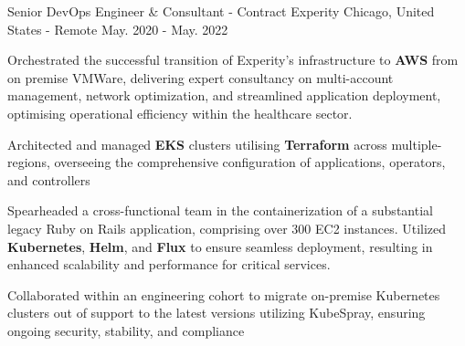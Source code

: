 \begin{cventries}
  \cventry
    {Senior DevOps Engineer \& Consultant - Contract} %
    {Experity} %
    {Chicago, United States - Remote} %
    {May. 2020 - May. 2022} %
    {
      \begin{cvitems} %
        \item {Orchestrated the successful transition of Experity's infrastructure to \textbf{AWS} from on premise VMWare, delivering expert consultancy on multi-account management, network optimization, and streamlined application deployment, optimising operational efficiency within the healthcare sector.}
        \item {Architected and managed \textbf{EKS} clusters utilising \textbf{Terraform} across multiple-regions, overseeing the comprehensive configuration of applications, operators, and controllers}
        \item {Spearheaded a cross-functional team in the containerization of a substantial legacy Ruby on Rails application, comprising over 300 EC2 instances. Utilized \textbf{Kubernetes}, \textbf{Helm}, and \textbf{Flux} to ensure seamless deployment, resulting in enhanced scalability and performance for critical services.}
        \item {Collaborated within an engineering cohort to migrate on-premise Kubernetes clusters out of support to the latest versions utilizing KubeSpray, ensuring ongoing security, stability, and compliance}
      \end{cvitems}
    }



\end{cventries}
